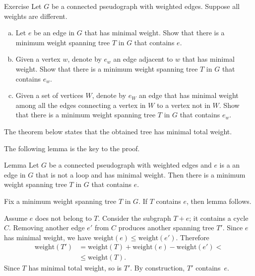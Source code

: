 \begin{thm}{Exercise}
Let $G$ be a connected pseudograph with weighted edges.
Suppose all weights are different.
\begin{enumerate}[(a)]
\item Let $e$ be an edge in $G$ that has minimal weight.
Show that there is a minimum weight spanning tree $T$ in $G$ that contains $e$.
\item Given a vertex $w$, denote by $e_w$ an edge adjacent to $w$ that has minimal weight.
Show that there is a minimum weight spanning tree $T$ in $G$ that contains $e_w$.
\item Given a set of vertices $W$, denote by $e_W$ an edge that has minimal weight among all the edges connecting a vertex in $W$ to a vertex not in $W$.
Show that there is a minimum weight spanning tree $T$ in $G$ that contains $e_w$.
\end{enumerate}

\end{thm}



































The theorem below states that the obtained tree has minimal total weight.



The following lemma is the key to the proof.

\begin{thm}{Lemma}\label{lem:kruskal}
Let $G$ be a connected pseudograph with weighted edges and $e$ is a an edge in $G$ that is not a loop and has minimal weight.
Then there is a minimum weight spanning tree $T$ in $G$ that contains $e$.
\end{thm}

Fix a minimum weight spanning tree $T$ in $G$.
If $T$ contains $e$, then lemma follows.

Assume $e$ does not belong to $T$.
Consider the subgraph $T+e$; it contains a cycle $C$.
Removing another edge $e'$ from $C$ produces another spanning tree $T'$.
Since $e$ has minimal weight, we have $\mathrm{weight}(e)\le \mathrm{weight}(e')$.
Therefore
\begin{align*}
 \mathrm{weight}(T')&=\mathrm{weight}(T)+\mathrm{weight}(e)-\mathrm{weight}(e')<
 \\
 &\le\mathrm{weight}(T).
\end{align*}
Since $T$ has minimal total weight, so is $T'$.
By construction, $T'$ contains~$e$.
\qeds



